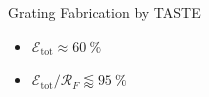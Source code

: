\documentclass[aspectratio=169,9pt]{beamer}
\begin{document}
\begin{frame}{Grating Fabrication by TASTE}
\begin{minipage}[t]{0.33\linewidth}
\begin{itemize}
    \begin{itemize}
    \item[$\square$] $\mathscr{E}_{\text{tot}} \approx \SI{60}{\percent}$
    \item[$\square$] $\mathscr{E}_{\text{tot}} / \mathcal{R}_{F} \lessapprox \SI{95}{\percent}$  %
  \end{itemize}
 \end{itemize}
 \vspace{5mm}
 \end{minipage}
\end{frame}
\end{document}
